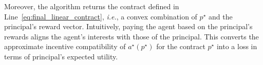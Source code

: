 %
%
Moreover, the algorithm returns the contract defined in Line~\ref{eq:final_linear_contract}, \emph{i.e.}, a convex combination of $p^\star$ and the principal's reward vector.
%
Intuitively, paying the agent based on the  principal's rewards aligns the agent's interests with those of the principal.
%
This converts the approximate incentive compatibility of $a^\star(p^\star)$ for the contract $p^\star$ into a loss in terms of principal's expected utility.

%

  

